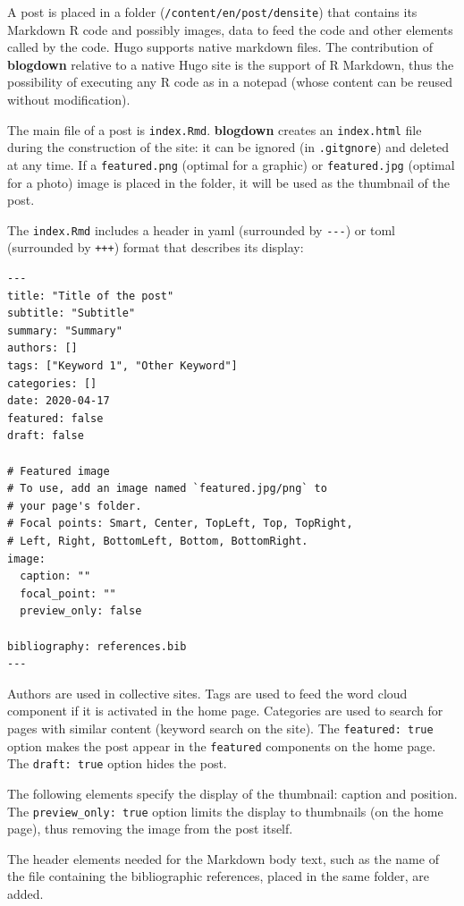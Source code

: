 \documentclass[
  12pt,
  american,
  a4paper,
  extrafontsizes,onecolumn,openright
  ]{memoir}
\begin{document}
A post is placed in a folder (\texttt{/content/en/post/densite}) that contains its Markdown R code and possibly images, data to feed the code and other elements called by the code.
Hugo supports native markdown files.
The contribution of \textbf{blogdown} relative to a native Hugo site is the support of R Markdown, thus the possibility of executing any R code as in a notepad (whose content can be reused without modification).

The main file of a post is \texttt{index.Rmd}.
\textbf{blogdown} creates an \texttt{index.html} file during the construction of the site: it can be ignored (in \texttt{.gitgnore}) and deleted at any time.
If a \texttt{featured.png} (optimal for a graphic) or \texttt{featured.jpg} (optimal for a photo) image is placed in the folder, it will be used as the thumbnail of the post.

The \texttt{index.Rmd} includes a header in yaml (surrounded by \texttt{-\/-\/-}) or toml (surrounded by \texttt{+++}) format that describes its display:

\begin{verbatim}
---
title: "Title of the post"
subtitle: "Subtitle"
summary: "Summary"
authors: []
tags: ["Keyword 1", "Other Keyword"]
categories: []
date: 2020-04-17
featured: false
draft: false

# Featured image
# To use, add an image named `featured.jpg/png` to 
# your page's folder.
# Focal points: Smart, Center, TopLeft, Top, TopRight,
# Left, Right, BottomLeft, Bottom, BottomRight.
image:
  caption: ""
  focal_point: ""
  preview_only: false
  
bibliography: references.bib
---
\end{verbatim}

Authors are used in collective sites.
Tags are used to feed the word cloud component if it is activated in the home page.
Categories are used to search for pages with similar content (keyword search on the site).
The \texttt{featured:\ true} option makes the post appear in the \texttt{featured} components on the home page.
The \texttt{draft:\ true} option hides the post.

The following elements specify the display of the thumbnail: caption and position.
The \texttt{preview\_only:\ true} option limits the display to thumbnails (on the home page), thus removing the image from the post itself.

The header elements needed for the Markdown body text, such as the name of the file containing the bibliographic references, placed in the same folder, are added.
\end{document}
